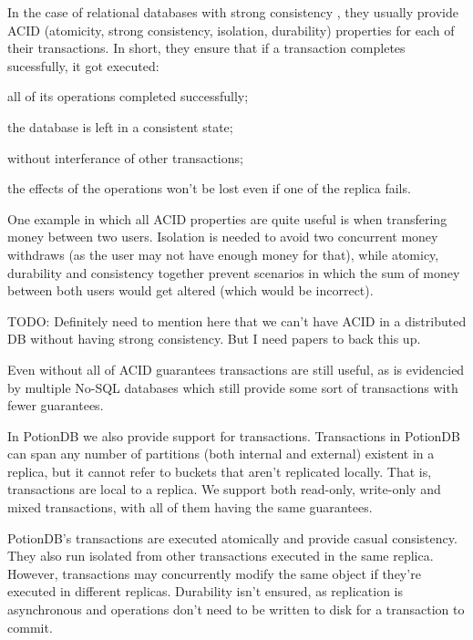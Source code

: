 \documentclass{vldb}
\newcommand{\grumbler}[2]{{\color{red}{\bf #1:} #2}}
\newcommand{\andre}[1]{\grumbler{andre}{#1}}
\begin{document}
In the case of relational databases with strong consistency \cite{???} %
, they usually provide ACID (atomicity, strong consistency, isolation, durability) properties for each of their transactions.
In short, they ensure that if a transaction completes sucessfully, it got executed: 
\begin{enumerate*}
	\item all of its operations completed successfully;
	\item the database is left in a consistent state;
	\item without interferance of other transactions;
	\item the effects of the operations won't be lost even if one of the replica fails.
\end{enumerate*}
One example in which all ACID properties are quite useful is when transfering money between two users. Isolation is needed to avoid two concurrent money withdraws (as the user may not have enough money for that), while atomicy, durability and consistency together prevent scenarios in which the sum of money between both users would get altered (which would be incorrect).

\andre{TODO: Definitely need to mention here that we can't have ACID in a distributed DB without having strong consistency. But I need papers to back this up.} %

Even without all of ACID guarantees transactions are still useful, as is evidencied by multiple No-SQL databases which still provide some sort of transactions \cite{???} with fewer guarantees. %

In PotionDB we also provide support for transactions. 
Transactions in PotionDB can span any number of partitions (both internal and external) existent in a replica, but it cannot refer to buckets that aren't replicated locally.
That is, transactions are local to a replica.
We support both read-only, write-only and mixed transactions, with all of them having the same guarantees.

PotionDB's transactions are executed atomically and provide casual consistency. 
They also run isolated from other transactions executed in the same replica. 
However, transactions may concurrently modify the same object if they're executed in different replicas.
Durability isn't ensured, as replication is asynchronous and operations don't need to be written to disk for a transaction to commit. %
\end{document}
